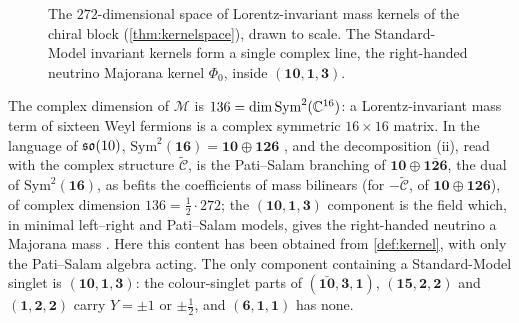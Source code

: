 \begin{figure}[t]
\centering
{}
\caption{The $272$-dimensional space of Lorentz-invariant mass kernels of the chiral block (\cref{thm:kernelspace}), drawn to scale. The
Standard-Model invariant kernels form a single complex line, the right-handed neutrino Majorana kernel $\Phi_0$, inside $(\mathbf{10},\mathbf1,\mathbf3)$.}
\label{fig:kernels}
\end{figure}

The complex dimension of $\mathcal M$ is $136=\dim\mathrm{Sym}^2(\mathbb{C}^{16})$: a Lorentz-invariant mass term of sixteen Weyl fermions is a complex
symmetric $16\times16$ matrix. In the language of $\mathfrak{so}(10)$, $\mathrm{Sym}^2(\mathbf{16})=\mathbf{10}\oplus\mathbf{126}$ \cite{Slansky}, and the
decomposition (ii), read with the complex structure $\widetilde{\mathcal C}$, is the Pati--Salam branching of $\mathbf{10}\oplus\overline{\mathbf{126}}$, the dual of
$\mathrm{Sym}^2(\mathbf{16})$, as befits the coefficients of mass bilinears (for $-\widetilde{\mathcal C}$, of $\mathbf{10}\oplus\mathbf{126}$), of complex dimension
$136=\tfrac12\cdot272$; the $(\mathbf{10},\mathbf1,\mathbf3)$ component is the field which, in minimal left--right and Pati--Salam models, gives the right-handed
neutrino a Majorana mass \cite{MohapatraSenjanovic80,MohapatraSenjanovic81}.
Here this content has been obtained from \cref{def:kernel}, with only the Pati--Salam algebra acting. The only component containing a
Standard-Model singlet is $(\mathbf{10},\mathbf1,\mathbf3)$: the colour-singlet parts of $(\bar{\mathbf{10}},\mathbf3,\mathbf1)$, $(\mathbf{15},\mathbf2,\mathbf2)$ and $(\mathbf1,\mathbf2,\mathbf2)$ carry
$Y=\pm1$ or $\pm\tfrac12$, and $(\mathbf6,\mathbf1,\mathbf1)$ has none.


